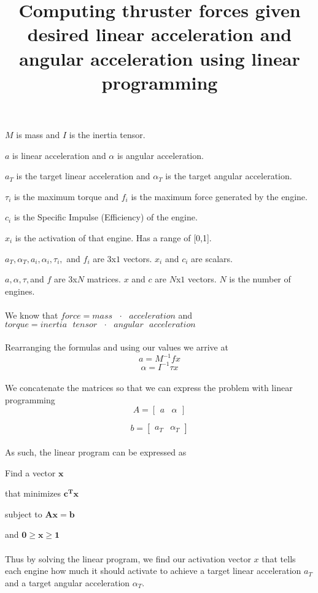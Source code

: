 \documentclass{article}
\begin{document}
\title{Computing thruster forces given desired linear acceleration and angular acceleration using linear programming}
\maketitle
$M$ is mass and $I$ is the inertia tensor.

$a$ is linear acceleration and $\alpha$ is angular acceleration.

$a_T$ is the target linear acceleration and $\alpha_T$ is the target angular acceleration.

$\tau_i$ is the maximum torque and $f_i$ is the maximum force generated by the engine. 

$c_i$ is the Specific Impulse (Efficiency) of the engine.

$x_i$ is the activation of that engine. Has a range of [0,1].

$ a_T, \alpha_T, a_i, \alpha_i, \tau_i,$ and $f_i$ are $3$x$1$ vectors. $x_i$ and $c_i$ are scalars.

$ a, \alpha, \tau, $and $f$ are $3$x$N$ matrices. $x$ and $c$ are $N$x$1$ vectors. $N$ is the number of engines.
\\
\\
We know that $force = mass \text{ }\cdot\text{ } acceleration$ and $torque = inertia\text{ }tensor  \text{ }\cdot\text{ } angular\text{ } acceleration$
\\
\\
Rearranging the formulas and using our values we arrive at
$$ a = M^{-1} f x$$
$$ \alpha = I^{-1} \tau x $$
\\
We concatenate the matrices so that we can express the problem with linear programming
$$ A = \begin{bmatrix}
a & \alpha
\end{bmatrix} $$

$$ b = \begin{bmatrix}
a_T & \alpha_T
\end{bmatrix} $$
\\
As such, the linear program can be expressed as

Find a vector $\mathbf{x}$

that minimizes $ \mathbf{c^Tx} $

subject to $\mathbf{Ax = b}$

and $\mathbf{0\geq x \geq 1}$\\
\\
Thus by solving the linear program, we find our activation vector $x$ that tells each engine how much it should activate to achieve a target linear acceleration $a_T$ and a target angular acceleration $\alpha_T$.
\end{document}
